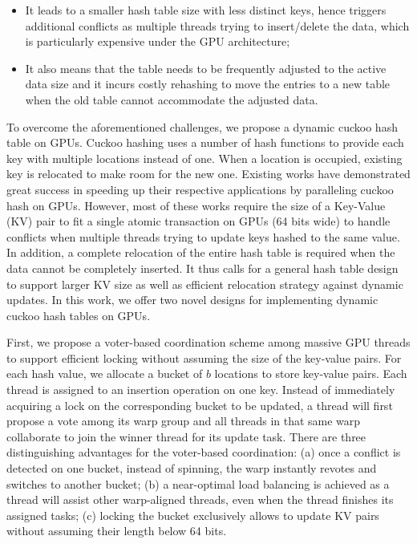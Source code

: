 \begin{itemize}
	\item It leads to a smaller hash table size with less distinct keys, hence triggers additional conflicts as multiple threads trying to insert/delete the data, which is particularly expensive under the GPU architecture;
	\item It also means that the table needs to be frequently adjusted to the active data size and it incurs costly rehashing to move the entries to a new table when the old table cannot accommodate the adjusted data. 
\end{itemize}

To overcome the aforementioned challenges, we propose a dynamic cuckoo hash table on GPUs. Cuckoo hashing \cite{pagh2004cuckoo} uses a number of hash functions to provide each key with multiple locations instead of one. When a location is occupied, existing key is relocated to make room for the new one. Existing works \cite{alcantara2009real,alcantara2011building,zhang2015mega,breslow2016horton} have demonstrated great success in speeding up their respective applications by paralleling cuckoo hash on GPUs. 
However, most of these works require the size of a Key-Value (KV) pair to fit a single atomic transaction on GPUs (64 bits wide) to handle conflicts when multiple threads trying to update keys hashed to the same value.
In addition, a complete relocation of the entire hash table is required when the data cannot be completely inserted. 
It thus calls for a general hash table design to support larger KV size as well as efficient relocation strategy against dynamic updates.
In this work, we offer two novel designs for implementing dynamic cuckoo hash tables on GPUs. 

First, we propose a voter-based coordination scheme among massive GPU threads to support efficient locking without assuming the size of the key-value pairs.
For each hash value, we allocate a bucket of $b$ locations to store key-value pairs. 
Each thread is assigned to an insertion operation on one key. Instead of immediately acquiring a lock on the corresponding bucket to be updated, a thread will first propose a vote among its warp group and all threads in that same warp collaborate to join the winner thread for its update task. There are three distinguishing advantages for the voter-based coordination: (a) once a conflict is detected on one bucket, instead of spinning, the warp instantly revotes and switches to another bucket; (b) a near-optimal load balancing is achieved as a thread will assist other warp-aligned threads, even when the thread finishes its assigned tasks; (c) locking the bucket exclusively allows to update KV pairs without assuming their length below 64 bits.

